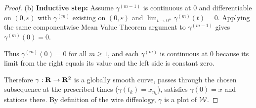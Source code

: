 \begin{proof}
  (b) \textbf{Inductive step:}
  Assume $\gamma^{(m-1)}$ is continuous at $0$ and differentiable on $(0,\varepsilon)$ with $\gamma^{(m)}$ existing on $(0,\varepsilon)$ and $\lim_{t\to0^+} \gamma^{(m)}(t) = 0$.
  Applying the same componentwise Mean Value Theorem argument to $\gamma^{(m-1)}$ gives $\gamma^{(m)}(0)=0$.
  
  Thus $\gamma^{(m)}(0)=0$ for all $m \ge 1$,
  and each $\gamma^{(m)}$ is continuous at $0$ because its limit from the right equals its value and the left side is constant zero.
  
  Therefore $\gamma: \mathbf{R} \to \mathbf{R}^2$ is a globally smooth curve,
  passes through the chosen subsequence at the prescribed times ($\gamma(t_k)=x_{n_k}$),
  satisfies $\gamma(0)=x$ and stations there.
  By definition of the wire diffeology,
  $\gamma$ is a plot of $\mathcal{W}$.
\end{proof}
